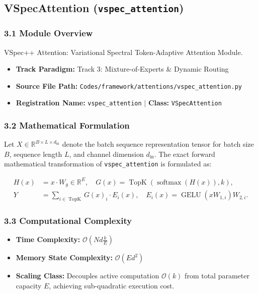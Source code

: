 \subsection{VSpecAttention (\texttt{vspec\_attention})}
\label{sec:app_module_vspec\_attention}

\subsubsection*{3.1 Module Overview}
VSpec++ Attention: Variational Spectral Token-Adaptive Attention Module.
\begin{itemize}
    \item \textbf{Track Paradigm:} Track 3: Mixture-of-Experts & Dynamic Routing
    \item \textbf{Source File Path:} \texttt{Codes/framework/attentions/vspec\_attention.py}
    \item \textbf{Registration Name:} \texttt{vspec\_attention} $\mid$ \textbf{Class:} \texttt{VSpecAttention}
\end{itemize}

\subsubsection*{3.2 Mathematical Formulation}
Let $X \in \mathbb{R}^{B \times L \times d_{\text{in}}}$ denote the batch sequence representation tensor for batch size $B$, sequence length $L$, and channel dimension $d_{\text{in}}$. The exact forward mathematical transformation of \texttt{vspec\_attention} is formulated as:

\begin{align}
H(x) &= x \cdot W_g \in \mathbb{R}^{E}, \quad G(x) = \operatorname{TopK}\left(\operatorname{softmax}(H(x)), k\right), \\
Y &= \sum_{i \in \operatorname{TopK}} G(x)_i \cdot E_i(x), \quad E_i(x) = \operatorname{GELU}(x W_{1, i}) W_{2, i}.
\end{align}


\subsubsection*{3.3 Computational Complexity}
\begin{itemize}
    \item \textbf{Time Complexity:} $\mathcal{O}(N d \frac{k}{E})$
    \item \textbf{Memory State Complexity:} $\mathcal{O}(E d^2)$
    \item \textbf{Scaling Class:} Decouples active computation $\mathcal{O}(k)$ from total parameter capacity $E$, achieving sub-quadratic execution cost.
\end{itemize}

